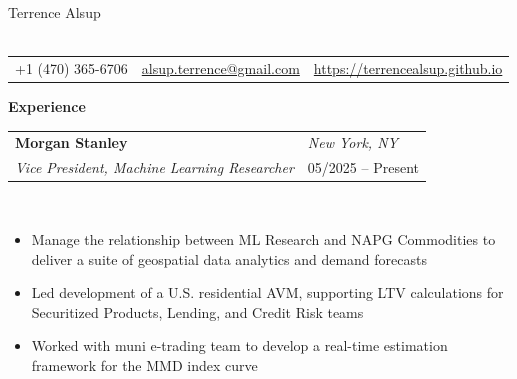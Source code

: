 \documentclass{article}
\begin{document}
\begin{center}
    {\Huge Terrence Alsup}\\
    ~\\
    \begin{tabular}{c | c | c}
        +1 (470) 365-6706 & \url{alsup.terrence@gmail.com} & \url{https://terrencealsup.github.io} \\
    \end{tabular}
\end{center}


\vspace{0.15in}

{\Large\bf Experience} \hrulefill \\

\begin{tabular}{p{4.8in}p{2in}}
    \bf{Morgan Stanley}  &  \emph{New York, NY} \\
    \emph{Vice President, Machine Learning Researcher} & 05/2025 -- Present\\
\end{tabular}
\vspace{-0.2in}
\begin{minipage}{0.03\textwidth}
~\\
\end{minipage}
\begin{minipage}{0.7\textwidth}
\begin{itemize}[label=\raisebox{0.25ex}{\tiny$\bullet$}]
    \item Manage the relationship between ML Research and NAPG Commodities to deliver a suite of geospatial data analytics and demand forecasts
    \item Led development of a U.S. residential AVM, supporting LTV calculations for Securitized Products, Lending, and Credit Risk teams
    \item Worked with muni e-trading team to develop a real-time estimation framework for the MMD index curve
\end{itemize}
\end{minipage}

\vspace{0.35in}
\end{document}

